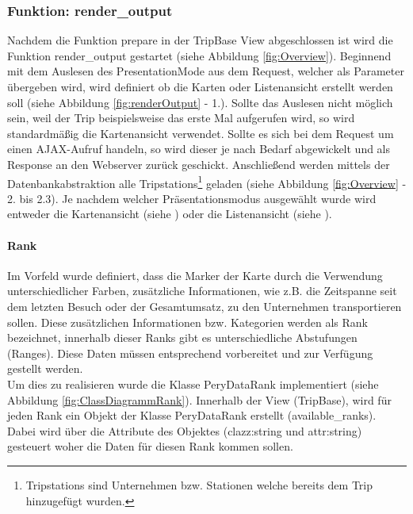 \documentclass[Bachelorarbeit.tex]{subfiles}
\begin{document}
\subsubsection*{Funktion: render\_output}
\label{renderOutput}
Nachdem die Funktion prepare in der TripBase View abgeschlossen ist wird die Funktion render\_output gestartet (siehe Abbildung \ref{fig:Overview}).
Beginnend mit dem Auslesen des PresentationMode aus dem Request, welcher als Parameter übergeben wird, wird definiert ob die Karten oder Listenansicht erstellt werden soll (siehe Abbildung \ref{fig:renderOutput} - 1.).
Sollte das Auslesen nicht möglich sein, weil der Trip beispielsweise das erste Mal aufgerufen wird, so wird standardmäßig die Kartenansicht verwendet.
Sollte es sich bei dem Request um einen \ac{AJAX}-Aufruf handeln, so wird dieser je nach Bedarf abgewickelt und als Response an den Webserver zurück geschickt.
Anschließend werden mittels der Datenbankabstraktion alle Tripstations\footnote{Tripstations sind Unternehmen bzw. Stationen welche bereits dem Trip hinzugefügt wurden.} geladen (siehe Abbildung \ref{fig:Overview} - 2. bis 2.3).
Je nachdem welcher Präsentationsmodus ausgewählt wurde wird entweder die Kartenansicht (siehe ) oder die Listenansicht (siehe ).

\paragraph{Rank}
\label{Rank}
Im Vorfeld wurde definiert, dass die Marker der Karte durch die Verwendung unterschiedlicher Farben, zusätzliche Informationen, wie z.B. die Zeitspanne seit dem letzten Besuch oder der Gesamtumsatz, zu den Unternehmen transportieren sollen. Diese zusätzlichen Informationen bzw. Kategorien werden als Rank bezeichnet, innerhalb dieser Ranks gibt es unterschiedliche Abstufungen (Ranges).
Diese Daten müssen entsprechend vorbereitet und zur Verfügung gestellt werden.
\\
Um dies zu realisieren wurde die Klasse PeryDataRank implementiert (siehe Abbildung \ref{fig:ClassDiagrammRank}). 
Innerhalb der View (TripBase), wird für jeden Rank ein Objekt der Klasse PeryDataRank erstellt (available\_ranks).
Dabei wird über die Attribute des Objektes (clazz:string und attr:string) gesteuert woher die Daten für diesen Rank kommen sollen. \\
\end{document}
